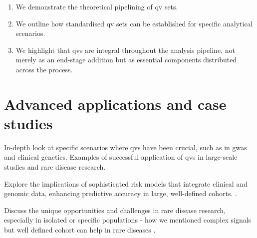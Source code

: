 \begin{enumerate}
    \item We demonstrate the theoretical pipelining of \ac{qv} sets.
    \item We outline how standardised \ac{qv} sets can be established for specific analytical scenarios.
    \item We highlight that \ac{qv}s are integral throughout the analysis pipeline, not merely as an end-stage addition but as essential components distributed across the process.
\end{enumerate}



\section{Advanced applications and case studies}
In-depth look at specific scenarios where \ac{qv}s have been crucial, such as in \ac{gwas} and clinical genetics. Examples of successful application of \ac{qv}s in large-scale studies and rare disease research.

Explore the implications of sophisticated risk models that integrate clinical and genomic data, enhancing predictive accuracy in large, well-defined cohorts.
\cite{riveros2021integrated, weale2021validation, sun2021polygenic}.

Discuss the unique opportunities and challenges in rare disease research, especially in isolated or specific populations - how we mentioned complex signals but well defined cohort can help in rare diseases
\cite{lim2014distribution}. %

